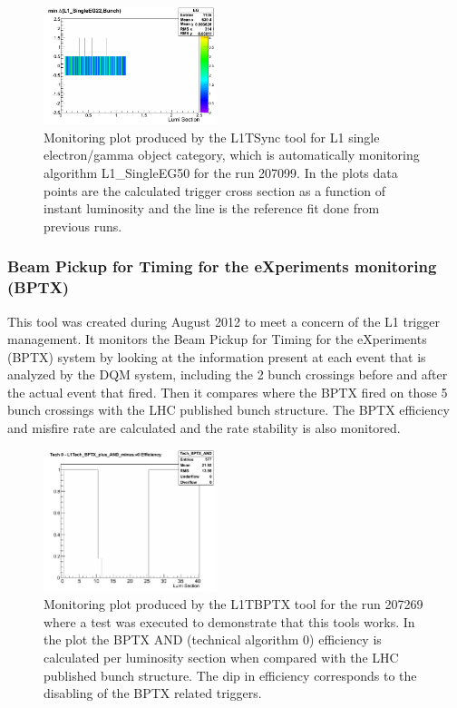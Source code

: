 \documentclass[%
reprint,
amsmath,
amssymb,
aps,
pra,
showkeys
]{revtex4-1}
\begin{document}
\begin{figure}[ht]
\centering
\includegraphics[width=0.45\textwidth]{img/L1TSync_L1_SingleEG22.png}
\caption{Monitoring plot produced by the L1TSync tool for L1 single electron/gamma object category, which is
automatically monitoring algorithm L1\_SingleEG50 for the run 207099. In the plots data points are the calculated
trigger cross section as a function of instant luminosity and the line is the reference fit done from previous runs.}
\label{figure_ServiceWork_L1TSync}
\end{figure}

\subsubsection{Beam Pickup for Timing for the eXperiments monitoring (BPTX)}

This tool was created during August 2012 to meet a concern of the L1 trigger management. It monitors the Beam
Pickup for Timing for the eXperiments (BPTX) system by looking at the information present at each event that 
is analyzed by the DQM system, including the 2 bunch crossings before and after the actual event that fired. Then it 
compares where the BPTX fired on those 5 bunch crossings with the LHC published bunch structure. The BPTX efficiency 
and misfire rate are calculated and the rate stability is also monitored.

\begin{figure}[ht]
\centering
\includegraphics[width=0.45\textwidth]{img/L1TBPTX_Tech_BPTX_AND.png}
\caption{Monitoring plot produced by the L1TBPTX tool for the run 207269 where a test was executed to demonstrate that 
this tools works. In the plot the BPTX AND (technical algorithm 0) efficiency is calculated per luminosity section 
when compared with the LHC published bunch structure. The dip in efficiency corresponds to the disabling of the BPTX 
related triggers.} 
\label{figure_ServiceWork_L1TBPTX}
\end{figure}
\end{document}
